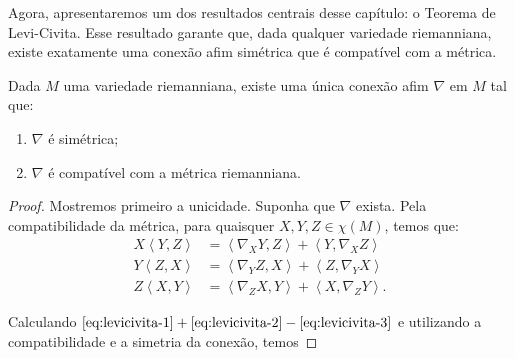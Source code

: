 Agora, apresentaremos um dos resultados centrais desse capítulo: o Teorema de Levi-Civita. Esse resultado garante que, dada qualquer variedade riemanniana, existe exatamente uma conexão afim simétrica que é compatível com a métrica.
\begin{theorem}
	\label{teo:levi-civita}
	Dada $M$ uma variedade riemanniana, existe uma única conexão afim $\nabla$ em $M$ tal que:
	\begin{enumerate}[label=(\roman*)]
		\item $\nabla$ é simétrica;
		\item $\nabla$ é compatível com a métrica riemanniana.
	\end{enumerate}
	\begin{proof}

		Mostremos primeiro a unicidade.
		Suponha que $\nabla$ exista. Pela compatibilidade da métrica, para quaisquer $X, Y, Z \in \chi(M)$, temos que:
		\begin{align}
			X\left<Y,Z\right>  & = \left<\nabla_{X}Y,Z\right> +\left<Y,\nabla_{X}Z\right>   \label{eq:levicivita-1} \\
			Y\left<Z,X\right>  & = \left<\nabla_{Y}Z,X\right> + \left<Z,\nabla_{Y}X\right>  \label{eq:levicivita-2} \\
			Z \left<X,Y\right> & = \left<\nabla_{Z}X,Y\right> + \left<X,\nabla_{Z}Y\right>. \label{eq:levicivita-3}
		\end{align}

		Calculando $\eqref{eq:levicivita-1}+\eqref{eq:levicivita-2}-\eqref{eq:levicivita-3}$ e utilizando a compatibilidade e a simetria da conexão, temos


\end{proof}
\end{theorem}
